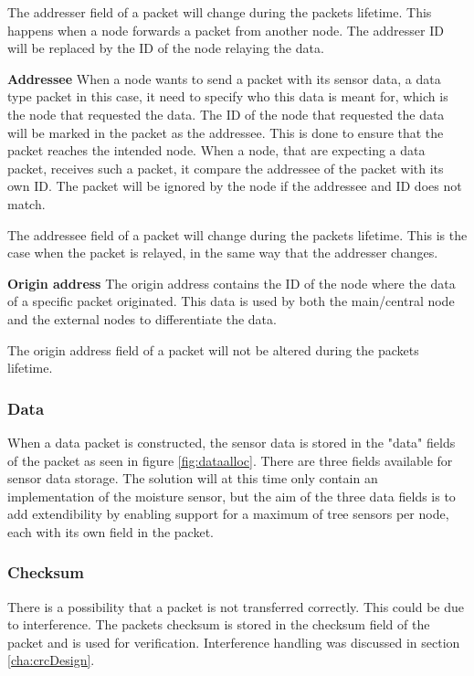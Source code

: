 The addresser field of a packet will change during the packets lifetime. This happens when a node forwards a packet from another node. The addresser ID will be replaced by the ID of the node relaying the data.

\textbf{Addressee}\newline
When a node wants to send a packet with its sensor data, a data type packet in this case, it need to specify who this data is meant for, which is the node that requested the data. The ID of the node that requested the data will be marked in the packet as the addressee. This is done to ensure that the packet reaches the intended node. When a node, that are expecting a data packet, receives such a packet, it compare the addressee of the packet with its own ID. The packet will be ignored by the node if the addressee and ID does not match.

The addressee field of a packet will change during the packets lifetime. This is the case when the packet is relayed, in the same way that the addresser changes.

\textbf{Origin address}\newline
The origin address contains the ID of the node where the data of a specific packet originated. This data is used by both the main/central node and the external nodes to differentiate the data.

The origin address field of a packet will not be altered during the packets lifetime.


\subsubsection{Data}
When a data packet is constructed, the sensor data is stored in the "data" fields of the packet as seen in figure \ref{fig:dataalloc}. There are three fields available for sensor data storage. The solution will at this time only contain an implementation of the moisture sensor, but the aim of the three data fields is to add extendibility by enabling support for a maximum of tree sensors per node, each with its own field in the packet.


\subsubsection{Checksum}
There is a possibility that a packet is not transferred correctly. This could be due to interference. The packets checksum is stored in the checksum field of the packet and is used for verification. Interference handling was discussed in section \ref{cha:crcDesign}.


